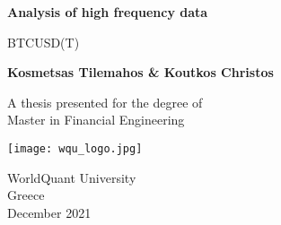 \begin{titlepage}
	\begin{center}
		\vspace*{1cm}
		
		\Huge
		\textbf{Analysis of high frequency data}
		
		\vspace{0.5cm}
		\LARGE
		BTCUSD(T)
		
		\vspace{1.5cm}
		
		\textbf{Kosmetsas Tilemahos \& Koutkos Christos}
		
		\vfill

		A thesis presented for the degree of \\
		Master in Financial Engineering
		
		\vspace{0.8cm}
		
		\texttt{[image: wqu\_logo.jpg]}	
		
		\Large
		WorldQuant University\\
		Greece\\
		December 2021
		
		
	\end{center}
\end{titlepage}